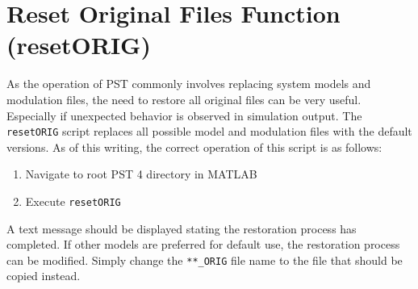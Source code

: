 \section{Reset Original Files Function (resetORIG)} 
As the operation of PST commonly involves replacing system models and modulation files, the need to restore all original files can be very useful.
Especially if unexpected behavior is observed in simulation output.
The \verb|resetORIG| script replaces all possible model and modulation files with the default versions.
As of this writing, the correct operation of this script is as follows:
\begin{enumerate}
 em
\item Navigate to root PST 4 directory in MATLAB
\item Execute \verb|resetORIG|
\end{enumerate}

A text message should be displayed stating the restoration process has completed.
If other models are preferred for default use, the restoration process can be modified.
Simply change the \verb|**_ORIG| file name to the file that should be copied instead.